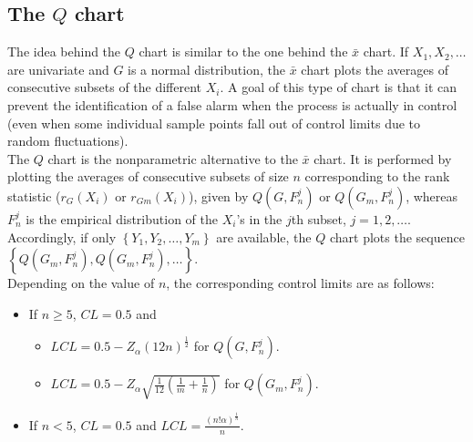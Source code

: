 \subsection{The $Q$ chart}
The idea behind the $Q$ chart is similar to the one behind the $\bar{x}$ chart. If $X_1, X_2, \dots$ are univariate and $G$ is a normal distribution, the $\bar{x}$ chart plots the averages of consecutive subsets of the different $X_i$. A goal of this type of chart is that it can prevent the identification of a false alarm when the process is actually in control (even when some individual sample points fall out of control limits due to random fluctuations). \\
The $Q$ chart is the nonparametric alternative to the $\bar{x}$ chart. It is performed by plotting the averages of consecutive subsets of size $n$ corresponding to the rank statistic ($r_G(X_i)$ or $r_{Gm}(X_i)$), given by $Q\left( G,F_{n}^j\right)$ or $Q\left( G_{m},F_{n}^j\right)$, whereas $F_n^j$ is the empirical distribution of the $X_i$'s in the $j$th subset, $j =1, 2, \dots$. Accordingly, if only $\left\lbrace Y_1, Y_2,\ldots, Y_m \right\rbrace$ are available, the $Q$ chart plots the sequence $\left\lbrace Q\left( G_{m},F_{n}^j\right),Q\left( G_{m},F_{n}^j\right),\ldots\right\rbrace$.\\
Depending on the value of $n$, the corresponding control limits are as follows:
\begin{itemize}

\item If $n \geq 5$, $CL = 0.5$ and 

  \begin{itemize}
  
    \item $LCL = 0.5-Z_{\alpha}\left( 12n\right)^{\frac{1}{2}}$ for $Q\left( G,F_{n}^j\right)$.

    \item $LCL = 0.5-Z_{\alpha}\sqrt{\frac{1}{12}\left(\frac{1}{m}+\frac{1}{n}\right)}$ 
    for $Q\left( G_m,F_{n}^j\right)$.
  
  \end{itemize}

\item If $n < 5$, $CL = 0.5$ and $LCL = \frac{\left( n!\alpha\right)^{\frac{1}{n}}}{n}$.

\end{itemize}

